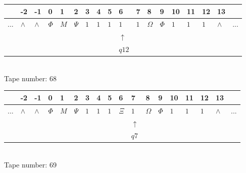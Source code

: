 \documentclass[11pt]{article}
\begin{document}
\begin{table}[H]
\centering
\begin{tabular}{llllllllllllllllll}
 & -2 & -1 & 0 & 1 & 2 & 3 & 4 & 5 & 6 & 7 & 8 & 9 & 10 & 11 & 12 & 13 & \\
\hline
$...$ & \multicolumn{1}{|l|}{$\wedge$} & \multicolumn{1}{|l|}{$\wedge$} & \multicolumn{1}{|l|}{$\Phi$} & \multicolumn{1}{|l|}{$M$} & \multicolumn{1}{|l|}{$\Psi$} & \multicolumn{1}{|l|}{$1$} & \multicolumn{1}{|l|}{$1$} & \multicolumn{1}{|l|}{$1$} & \multicolumn{1}{|l|}{$1$} & \multicolumn{1}{|l|}{$1$} & \multicolumn{1}{|l|}{$\Omega$} & \multicolumn{1}{|l|}{$\Phi$} & \multicolumn{1}{|l|}{$1$} & \multicolumn{1}{|l|}{$1$} & \multicolumn{1}{|l|}{$1$} & \multicolumn{1}{|l|}{$\wedge$} & $...$\\
\hline
&  &  &  &  &  &  &  &  & $\uparrow$ &  &  &  &  &  &  &  &  \\
&  &  &  &  &  &  &  &  & $ q12 $ &  &  &  &  &  &  &  &  \\
\end{tabular}
\\
Tape number: 68
\noindent\makebox[\linewidth]{\hdashrule{\textwidth}{1pt}{1pt}}\end{table}

\begin{table}[H]
\centering
\begin{tabular}{llllllllllllllllll}
 & -2 & -1 & 0 & 1 & 2 & 3 & 4 & 5 & 6 & 7 & 8 & 9 & 10 & 11 & 12 & 13 & \\
\hline
$...$ & \multicolumn{1}{|l|}{$\wedge$} & \multicolumn{1}{|l|}{$\wedge$} & \multicolumn{1}{|l|}{$\Phi$} & \multicolumn{1}{|l|}{$M$} & \multicolumn{1}{|l|}{$\Psi$} & \multicolumn{1}{|l|}{$1$} & \multicolumn{1}{|l|}{$1$} & \multicolumn{1}{|l|}{$1$} & \multicolumn{1}{|l|}{$\Xi$} & \multicolumn{1}{|l|}{$1$} & \multicolumn{1}{|l|}{$\Omega$} & \multicolumn{1}{|l|}{$\Phi$} & \multicolumn{1}{|l|}{$1$} & \multicolumn{1}{|l|}{$1$} & \multicolumn{1}{|l|}{$1$} & \multicolumn{1}{|l|}{$\wedge$} & $...$\\
\hline
&  &  &  &  &  &  &  &  &  & $\uparrow$ &  &  &  &  &  &  &  \\
&  &  &  &  &  &  &  &  &  & $ q7 $ &  &  &  &  &  &  &  \\
\end{tabular}
\\
Tape number: 69
\noindent\makebox[\linewidth]{\hdashrule{\textwidth}{1pt}{1pt}}\end{table}
\end{document}
